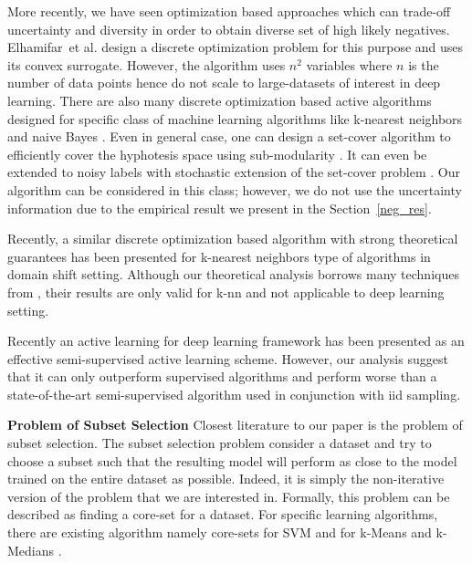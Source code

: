 \documentclass{article}
\begin{document}
More recently, we have seen optimization based approaches which can trade-off uncertainty and diversity in order to obtain diverse set of high likely negatives. Elhamifar~et al.  \cite{elhamifar2013convex} design a discrete optimization problem for this purpose and uses its convex surrogate. However, the algorithm uses $n^2$ variables where $n$ is the number of data points hence do not scale to large-datasets of interest in deep learning. There are also many discrete optimization based active algorithms designed for specific class of machine learning algorithms like k-nearest neighbors and naive Bayes \cite{wei2015submodularity}. Even in general case, one can design a set-cover algorithm to efficiently cover the hyphotesis space using sub-modularity \cite{guillory2010interactive}. It can even be extended to noisy labels with stochastic extension of the set-cover problem \cite{golovin2011adaptive}. Our algorithm can be considered in this class; however, we do not use the uncertainty information due to the empirical result we present in the Section~\ref{neg_res}. 


Recently, a similar discrete optimization based algorithm \cite{BerlindU15} with strong theoretical guarantees has been presented for k-nearest neighbors type of algorithms in domain shift setting. Although our theoretical analysis borrows many techniques from \cite{BerlindU15}, their results are only valid for k-nn and not applicable to deep learning setting. 


Recently an active learning for deep learning \cite{wang2016cost} framework has been presented as an effective semi-supervised active learning scheme. However, our analysis suggest that it can only outperform supervised algorithms and perform worse than a state-of-the-art semi-supervised algorithm used in conjunction with iid sampling.



\noindent\textbf{Problem of Subset Selection}
Closest literature to our paper is the problem of subset selection. The subset selection problem consider a dataset and try to choose a subset such that the resulting model will perform as close to the model trained on the entire dataset as possible. Indeed, it is simply the non-iterative version of the problem that we are interested in. Formally, this problem can be described as finding a core-set for a dataset. For specific learning algorithms, there are existing algorithm namely core-sets for SVM \cite{tsang2005core} and for k-Means and k-Medians \cite{har2005smaller}.
\end{document}
